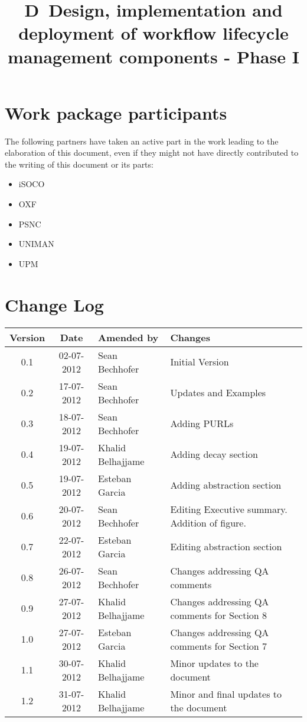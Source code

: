 \documentclass[a4paper, twoside, 11pt]{article}
\title{D\delid\ Design, implementation and deployment of workflow
  lifecycle management components - Phase I}
\begin{document}
\maketitle


\section*{Work package participants} The following partners have taken an active part in the work leading to the elaboration of this document, even if they might not have directly contributed to the writing of this document or its parts: %
\begin{itemize}
\item iSOCO
\item OXF
\item PSNC
\item UNIMAN
\item UPM
\end{itemize}

\section*{Change Log}
\begin{centering}

\begin{tabular}{|c|c|p{4.92cm}|p{6.5cm}|}

\hline \textbf{Version} & \textbf{Date} & \textbf{Amended by} & \textbf{Changes} \\ \hline
0.1 & 02-07-2012 & Sean Bechhofer & Initial Version \\ \hline
0.2 & 17-07-2012 & Sean Bechhofer & Updates and Examples \\ \hline
0.3 & 18-07-2012 & Sean Bechhofer & Adding PURLs\\ \hline
0.4 & 19-07-2012 & Khalid Belhajjame & Adding decay section \\ \hline
0.5 & 19-07-2012 & Esteban Garcia & Adding abstraction section \\ \hline
0.6 & 20-07-2012 & Sean Bechhofer & Editing Executive
summary. Addition of figure. \\ \hline
0.7 & 22-07-2012 & Esteban Garcia & Editing abstraction section \\ \hline
0.8 & 26-07-2012 & Sean Bechhofer & Changes addressing QA comments \\ \hline
0.9 & 27-07-2012 & Khalid Belhajjame & Changes addressing QA comments for Section 8 \\ \hline
1.0 & 27-07-2012 & Esteban Garcia & Changes addressing QA comments for Section 7 \\ \hline
1.1 & 30-07-2012 & Khalid Belhajjame & Minor updates to the document \\ \hline
1.2 & 31-07-2012 & Khalid Belhajjame & Minor and final updates to the document \\ \hline

\end{tabular}

\end{centering}
\clearpage
\end{document}
